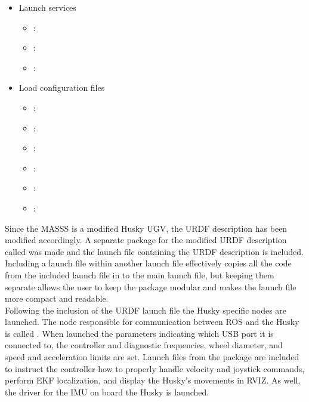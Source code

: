\begin{itemize}
\begin{itemize}
\end{itemize}

\item Launch services

\begin{itemize}

\item {} : 
\item {} : 
\item {} : 

\end{itemize}

\item Load configuration files

\begin{itemize}

\item {} : 
\item {} : 
\item {} : 
\item {} : 
\item {} : 
\item {} : 
\end{itemize}

\end{itemize}

Since the MASSS is a modified Husky UGV, the URDF description has been modified accordingly. A separate package for the modified URDF description called  was made and the launch file containing the URDF description is included. Including a launch file within another launch file effectively copies all the code from the included launch file in to the main launch file, but keeping them separate allows the user to keep the package modular and makes the launch file more compact and readable.\\

Following the inclusion of the URDF launch file the Husky specific nodes are launched. The node responsible for communication between ROS and the Husky is called . When launched the parameters indicating which USB port it is connected to, the controller and diagnostic frequencies, wheel diameter, and speed and acceleration limits are set. Launch files from the  package are included to instruct the controller how to properly handle  velocity and joystick commands, perform EKF localization, and display the Husky's movements in RVIZ. As well, the driver for the IMU on board the Husky is launched.\\


